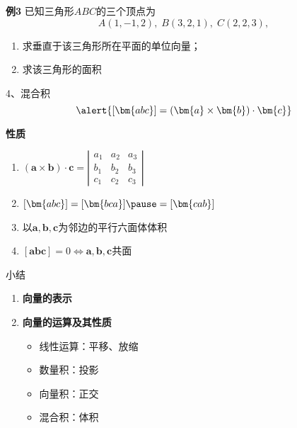 \begin{frame}
	\linespread{1.2}
	\begin{exampleblock}{{\bf 例3}\hfill}
		已知三角形$ABC$的三个顶点为
		$$A(1,-1,2),\;B(3,2,1),\;C(2,2,3),$$
		\vspace{-3ex}
		\begin{enumerate}
		  \item 求垂直于该三角形所在平面的单位向量；
		  \item 求该三角形的面积
		\end{enumerate}
	\end{exampleblock}
\end{frame}

\begin{frame}{4、混合积}
	\linespread{1.2}\pause 
	$$\alert{[\bm{abc}]=(\bm{a}\times\bm{b})\cdot\bm{c}}$$\pause 
	\vspace{-1em}
	\begin{block}{{\bf 性质}\hfill}
		\begin{enumerate}
		  	\item $(\bm{a}\times\bm{b})\cdot\bm{c}=
			  \left|\begin{array}{ccc}
				a_1 & a_2 & a_3\\
				b_1 & b_2 & b_3\\
				c_1 & c_2 & c_3
				\end{array}\right|$\pause 
			\item $[\bm{abc}]=[\bm{bca}]\pause =[\bm{cab}]$\pause 
			\item {}以$\bm{a},\bm{b},\bm{c}$为邻边的平行六面体体积\pause 
			\item $[\bm{abc}]=0\Leftrightarrow\bm{a},\bm{b},\bm{c}$共面
		\end{enumerate}
	\end{block}
\end{frame}

\begin{frame}[<+->]{小结}
	\linespread{1.8}
	\begin{enumerate}
	  \item {\bf 向量的表示}
	  \item {\bf 向量的运算及其性质}
	  \begin{itemize}
	    \item 线性运算：平移、放缩
	    \item 数量积：投影
	    \item 向量积：正交
	    \item 混合积：体积
	  \end{itemize}
	\end{enumerate}
\end{frame}

